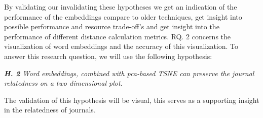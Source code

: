 \documentclass[../../Thesis.tex]{subfiles}
\begin{document}
By validating our invalidating  these hypotheses we get an indication of the performance of the embeddings compare to older techniques,  get insight into possible performance and resource trade-off's and get insight into the performance of different distance calculation metrics. 
RQ. 2 concerns the visualization of word embeddings and the accuracy of this visualization. To answer this research question, we will use the following hypothesis:
\begin{jumpin}
\textit{\textbf{H. 2} Word embeddings, combined with pca-based TSNE can preserve the journal relatedness on a two dimensional plot.}
\end{jumpin}
The validation of this hypothesis will be visual, this serves as a supporting insight in the relatedness of journals.
\end{document}
